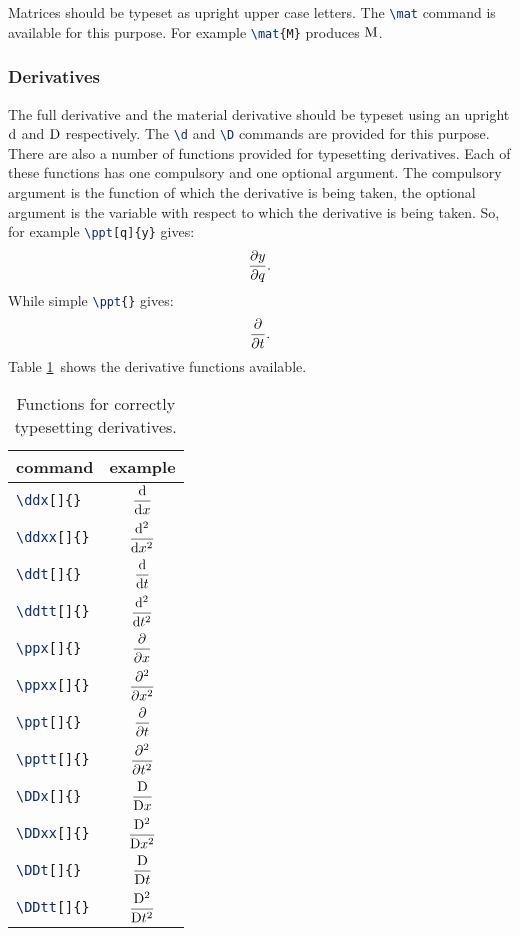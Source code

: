 Matrices should be typeset as upright upper case letters. The
\lstinline[language=TeX]+\mat+ command is available for this purpose. For
example \lstinline[language=TeX]+\mat{M}+ produces $\mat{M}$.

\subsubsection{Derivatives}

The full derivative and the material derivative should be typeset using an
upright $\d$ and $\D$ respectively. The \lstinline[language=TeX]+\d+ and
\lstinline[language=TeX]+\D+ commands are provided for this purpose. There
are also a number of functions provided for typesetting derivatives. Each of
these functions has one compulsory and one optional argument. The
compulsory argument is the function of which the derivative is being taken,
the optional argument is the variable with respect to which the derivative
is being taken. So, for example \lstinline[language=TeX]+\ppt[q]{y}+ gives:
\begin{equation*}
  \ppt[q]{y}.
\end{equation*}
While simple \lstinline[language=TeX]+\ppt{}+ gives:
\begin{equation*}
  \ppt{}.
\end{equation*}
Table \ref{tab:derivatives}\ shows the derivative functions available.
\begin{table}[ht]
  \centering
  \begin{tabular}{lc}
    \textbf{command} & \textbf{example}\\\hline
    \lstinline[language=TeX]+\ddx[]{}+ & \rule{0pt}{4ex}$\displaystyle\ddx{}$\\
    \lstinline[language=TeX]+\ddxx[]{}+ & \rule{0pt}{4ex}$\displaystyle\ddxx{}$\\
    \lstinline[language=TeX]+\ddt[]{}+ & \rule{0pt}{4ex}$\displaystyle\ddt{}$\\
    \lstinline[language=TeX]+\ddtt[]{}+ & \rule{0pt}{4ex}$\displaystyle\ddtt{}$\\
    \lstinline[language=TeX]+\ppx[]{}+ & \rule{0pt}{4ex}$\displaystyle\ppx{}$\\
    \lstinline[language=TeX]+\ppxx[]{}+ & \rule{0pt}{4ex}$\displaystyle\ppxx{}$\\
    \lstinline[language=TeX]+\ppt[]{}+ & \rule{0pt}{4ex}$\displaystyle\ppt{}$\\
    \lstinline[language=TeX]+\pptt[]{}+ & \rule{0pt}{4ex}$\displaystyle\pptt{}$\\
    \lstinline[language=TeX]+\DDx[]{}+ & \rule{0pt}{4ex}$\displaystyle\DDx{}$\\
    \lstinline[language=TeX]+\DDxx[]{}+ & \rule{0pt}{4ex}$\displaystyle\DDxx{}$\\
    \lstinline[language=TeX]+\DDt[]{}+ & \rule{0pt}{4ex}$\displaystyle\DDt{}$\\
    \lstinline[language=TeX]+\DDtt[]{}+ & \rule{0pt}{4ex}$\displaystyle\DDtt{}$\\ 
  \end{tabular}
  \caption{Functions for correctly typesetting derivatives.}
  \label{tab:derivatives}
\end{table}

